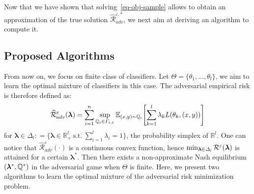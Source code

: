 Now that we have shown that solving~\eqref{eq-obj-sample} allows to obtain an approximation of the true solution $\widehat{\mathcal{R}}_{adv}^{\varepsilon,*}$, we next aim at deriving an algorithm to compute it. 

\subsection{Proposed Algorithms}
\label{sec:proposed-algo}
From now on, we focus on finite class of classifiers. Let $\Theta = \{\theta_1,\dots,\theta_l\}$, we aim to learn the optimal mixture of classifiers in this case. The adversarial empirical risk  is therefore defined as:
\begin{align*}
    \widehat{\mathcal{R}}_{adv}^\varepsilon(\bm{\lambda})= \sum_{i=1}^\numsamples\sup_{\QQ_i\in\Gamma_{i,\varepsilon}}\mathbb{E}_{(x,y)\sim \QQ_i}\left[\sum_{k=1}^l \lambda_k \loss(\theta_k,(x,y))\right]
\end{align*}
for $\bm{\lambda}\in\Delta_l: = \{\bm{\lambda}\in\mathbb{R}_+^l~\mathrm{s.t.}~\sum_{i=1}^l\lambda_i=1\}$, the probability simplex of $\mathbb{R}^l$. One can notice that $ \widehat{\mathcal{R}}_{adv}^\varepsilon(\cdot)$ is a continuous convex function, hence $\min_{\bm{\lambda}\in\Delta_l}\mathcal{R}^\varepsilon(\bm{\lambda})$ is attained for a certain $\bm{\lambda}^*$. Then there exists a non-approximate Nash equilibrium $(\bm{\lambda}^*,\mathbb{Q}^*)$ in the adversarial game when $\Theta$ is finite. Here, we present two algorithms to learn the optimal mixture of the adversarial risk minimization problem.


